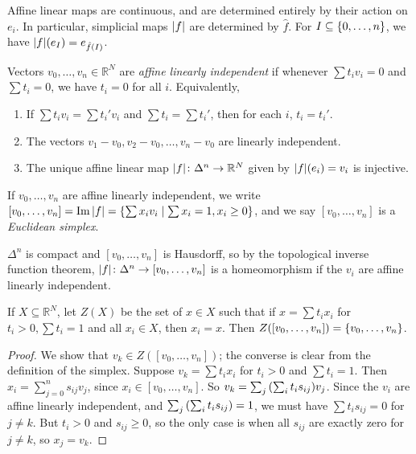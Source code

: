 \begin{remark}
	Affine linear maps are continuous, and are determined entirely by their action on \( e_i \).
	In particular, simplicial maps \( \abs{f} \) are determined by \( \hat f \).
	For \( I \subseteq \qty{0, \dots, n} \), we have \( \abs{f}(e_I) = e_{\hat f(I)} \).
\end{remark}
\begin{definition}
	Vectors \( v_0, \dots, v_n \in \mathbb R^N \) are \emph{affine linearly independent} if whenever \( \sum t_i v_i = 0 \) and \( \sum t_i = 0 \), we have \( t_i = 0 \) for all \( i \).
	Equivalently,
	\begin{enumerate}
		\item If \( \sum t_i v_i = \sum t_i' v_i \) and \( \sum t_i = \sum t_i' \), then for each \( i \), \( t_i = t_i' \).
		\item The vectors \( v_1 - v_0, v_2 - v_0, \dots, v_n - v_0 \) are linearly independent.
		\item The unique affine linear map \( \abs{f} \colon \Delta^n \to \mathbb R^N \) given by \( \abs{f}(e_i) = v_i \) is injective.
	\end{enumerate}
	If \( v_0, \dots, v_n \) are affine linearly independent, we write \( [v_0, \dots, v_n] = \Im \abs{f} = \qty{\sum x_i v_i \mid \sum x_i = 1, x_i \geq 0} \), and we say \( [v_0, \dots, v_n] \) is a \emph{Euclidean simplex}.
\end{definition}
\begin{remark}
	\( \Delta^n \) is compact and \( [v_0, \dots, v_n] \) is Hausdorff, so by the topological inverse function theorem, \( \abs{f} \colon \Delta^n \to [v_0, \dots, v_n] \) is a homeomorphism if the \( v_i \) are affine linearly independent.
\end{remark}
\begin{lemma}
	If \( X \subseteq \mathbb R^N \), let \( Z(X) \) be the set of \( x \in X \) such that if \( x = \sum t_i x_i \) for \( t_i > 0, \sum t_i = 1 \) and all \( x_i \in X \), then \( x_i = x \).
	Then \( Z([v_0, \dots, v_n]) = \qty{v_0, \dots, v_n} \).
\end{lemma}
\begin{proof}
	We show that \( v_k \in Z([v_0, \dots, v_n]) \); the converse is clear from the definition of the simplex.
	Suppose \( v_k = \sum t_i x_i \) for \( t_i > 0 \) and \( \sum t_i = 1 \).
	Then \( x_i = \sum_{j=0}^n s_{ij} v_j \), since \( x_i \in [v_0, \dots, v_n] \).
	So \( v_k = \sum_j \qty(\sum_i t_i s_{ij}) v_j \).
	Since the \( v_i \) are affine linearly independent, and \( \sum_j \qty(\sum_i t_i s_{ij}) = 1 \), we must have \( \sum t_i s_{ij} = 0 \) for \( j \neq k \).
	But \( t_i > 0 \) and \( s_{ij} \geq 0 \), so the only case is when all \( s_{ij} \) are exactly zero for \( j \neq k \), so \( x_j = v_k \).
\end{proof}
